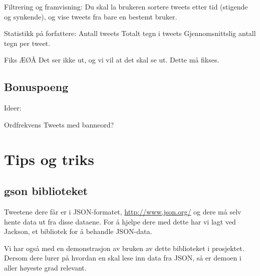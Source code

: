 \documentclass{article}
\begin{document}
Filtrering og framvisning: Du skal la brukeren sortere tweets etter tid (stigende og synkende), og vise tweets fra bare en bestemt bruker.

 
Statistikk på forfattere:
 Antall tweets
 Totalt tegn i tweets
 Gjennomsnittslig antall tegn per tweet. %

Fiks ÆØÅ
 Det ser ikke ut, og vi vil at det skal se ut.
 Dette må fikses.
 
\subsection{Bonuspoeng}
Ideer:

Ordfrekvens
Tweets med banneord?

\section{Tips og triks}
\subsection{gson biblioteket}
Tweetene dere får er i JSON-formatet, \url{http://www.json.org/} og dere må selv hente data ut fra disse dataene.
For å hjelpe dere med dette har vi lagt ved Jackson, et bibliotek for å behandle JSON-data.

Vi har også med en demonstrasjon av bruken av dette biblioteket i prosjektet.
Dersom dere lurer på hvordan en skal lese inn data fra JSON, så er demoen i aller høyeste grad relevant.
\end{document}
